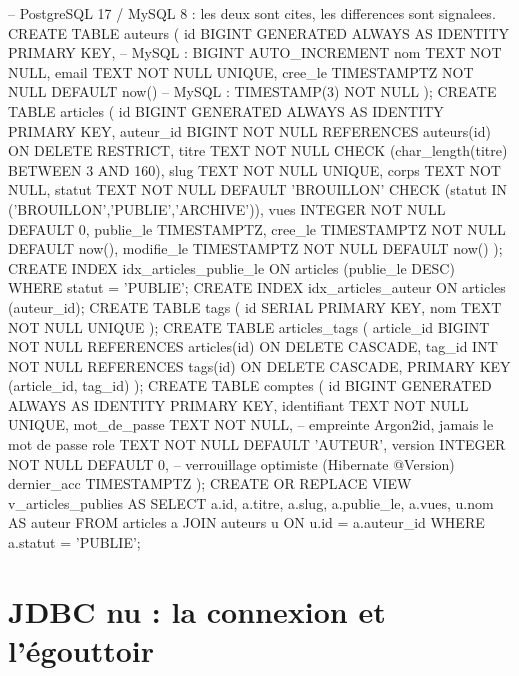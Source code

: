 \documentclass[12pt,a4paper,twoside,openright]{book}
\begin{document}
\begin{codesql}
-- PostgreSQL 17 / MySQL 8 : les deux sont cites, les differences sont signalees.
CREATE TABLE auteurs (
  id         BIGINT GENERATED ALWAYS AS IDENTITY PRIMARY KEY,   -- MySQL : BIGINT AUTO_INCREMENT
  nom        TEXT         NOT NULL,
  email      TEXT         NOT NULL UNIQUE,
  cree_le    TIMESTAMPTZ  NOT NULL DEFAULT now()                 -- MySQL : TIMESTAMP(3) NOT NULL
);
CREATE TABLE articles (
  id         BIGINT GENERATED ALWAYS AS IDENTITY PRIMARY KEY,
  auteur_id  BIGINT       NOT NULL REFERENCES auteurs(id) ON DELETE RESTRICT,
  titre      TEXT         NOT NULL CHECK (char_length(titre) BETWEEN 3 AND 160),
  slug       TEXT         NOT NULL UNIQUE,
  corps      TEXT         NOT NULL,
  statut     TEXT         NOT NULL DEFAULT 'BROUILLON'
             CHECK (statut IN ('BROUILLON','PUBLIE','ARCHIVE')),
  vues       INTEGER      NOT NULL DEFAULT 0,
  publie_le  TIMESTAMPTZ,
  cree_le    TIMESTAMPTZ  NOT NULL DEFAULT now(),
  modifie_le TIMESTAMPTZ  NOT NULL DEFAULT now()
);
CREATE INDEX idx_articles_publie_le ON articles (publie_le DESC) WHERE statut = 'PUBLIE';
CREATE INDEX idx_articles_auteur    ON articles (auteur_id);
CREATE TABLE tags (
  id   SERIAL PRIMARY KEY,
  nom  TEXT NOT NULL UNIQUE
);
CREATE TABLE articles_tags (
  article_id BIGINT NOT NULL REFERENCES articles(id) ON DELETE CASCADE,
  tag_id     INT    NOT NULL REFERENCES tags(id)     ON DELETE CASCADE,
  PRIMARY KEY (article_id, tag_id)
);
CREATE TABLE comptes (
  id            BIGINT GENERATED ALWAYS AS IDENTITY PRIMARY KEY,
  identifiant   TEXT NOT NULL UNIQUE,
  mot_de_passe  TEXT NOT NULL,                       -- empreinte Argon2id, jamais le mot de passe
  role          TEXT NOT NULL DEFAULT 'AUTEUR',
  version       INTEGER NOT NULL DEFAULT 0,          -- verrouillage optimiste (Hibernate @Version)
  dernier_acc   TIMESTAMPTZ
);
CREATE OR REPLACE VIEW v_articles_publies AS
  SELECT a.id, a.titre, a.slug, a.publie_le, a.vues, u.nom AS auteur
  FROM articles a JOIN auteurs u ON u.id = a.auteur_id
  WHERE a.statut = 'PUBLIE';
\end{codesql}

\section{JDBC nu : la connexion et l'\'egouttoir}
\end{document}
